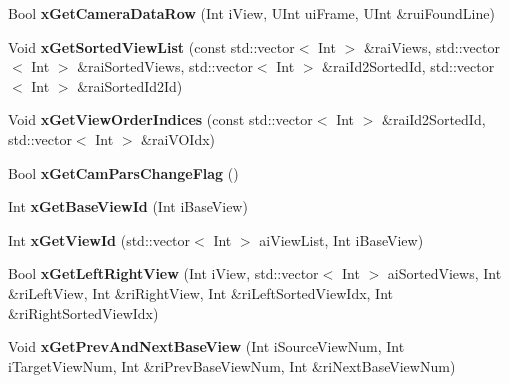 \begin{DoxyCompactItemize}
Bool {\bfseries x\+Get\+Camera\+Data\+Row} (Int i\+View, U\+Int ui\+Frame, U\+Int \&rui\+Found\+Line)
\item 
\mbox{\label{class_t_app_com_cam_para_af6767c1a5b9797d68a03c905599159ed}} 
Void {\bfseries x\+Get\+Sorted\+View\+List} (const std\+::vector$<$ Int $>$ \&rai\+Views, std\+::vector$<$ Int $>$ \&rai\+Sorted\+Views, std\+::vector$<$ Int $>$ \&rai\+Id2\+Sorted\+Id, std\+::vector$<$ Int $>$ \&rai\+Sorted\+Id2\+Id)
\item 
\mbox{\label{class_t_app_com_cam_para_ae393f95ccff16057b963fee96a93bcc2}} 
Void {\bfseries x\+Get\+View\+Order\+Indices} (const std\+::vector$<$ Int $>$ \&rai\+Id2\+Sorted\+Id, std\+::vector$<$ Int $>$ \&rai\+V\+O\+Idx)
\item 
\mbox{\label{class_t_app_com_cam_para_a5b7d5f8e228e256a10607532de64eba4}} 
Bool {\bfseries x\+Get\+Cam\+Pars\+Change\+Flag} ()
\item 
\mbox{\label{class_t_app_com_cam_para_ac1cc29a9edc3d572795ea4bdc85f6408}} 
Int {\bfseries x\+Get\+Base\+View\+Id} (Int i\+Base\+View)
\item 
\mbox{\label{class_t_app_com_cam_para_a7c3e2d0ffa17ec7c8aed9781facc5a39}} 
Int {\bfseries x\+Get\+View\+Id} (std\+::vector$<$ Int $>$ ai\+View\+List, Int i\+Base\+View)
\item 
\mbox{\label{class_t_app_com_cam_para_aad26e0f55875b5b34c97ef9cd40a9648}} 
Bool {\bfseries x\+Get\+Left\+Right\+View} (Int i\+View, std\+::vector$<$ Int $>$ ai\+Sorted\+Views, Int \&ri\+Left\+View, Int \&ri\+Right\+View, Int \&ri\+Left\+Sorted\+View\+Idx, Int \&ri\+Right\+Sorted\+View\+Idx)
\item 
\mbox{\label{class_t_app_com_cam_para_a130f21a108ac1513780134ed4785b885}} 
Void {\bfseries x\+Get\+Prev\+And\+Next\+Base\+View} (Int i\+Source\+View\+Num, Int i\+Target\+View\+Num, Int \&ri\+Prev\+Base\+View\+Num, Int \&ri\+Next\+Base\+View\+Num)
\item 
\mbox{\label{class_t_app_com_cam_para_a35c4085582e5361d7e88132b35c70cbc}} 

\end{DoxyCompactItemize}
